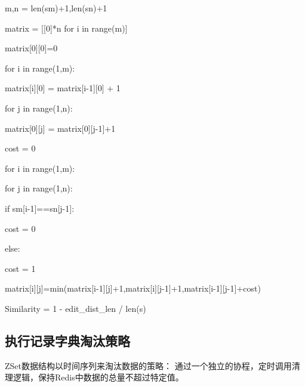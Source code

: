 \begin{algorithm}[H]
    \SetAlgoLined

    m,n = len(sm)+1,len(sn)+1

    matrix = [[0]*n for i in range(m)]

    matrix[0][0]=0

    for i in range(1,m):

    matrix[i][0] = matrix[i-1][0] + 1

    for j in range(1,n):

    matrix[0][j] = matrix[0][j-1]+1

    cost = 0

    for i in range(1,m):

    for j in range(1,n):

    if sm[i-1]==sn[j-1]:

    cost = 0

    else:

    cost = 1

    matrix[i][j]=min(matrix[i-1][j]+1,matrix[i][j-1]+1,matrix[i-1][j-1]+cost)

    Similarity = 1 - edit\_dist\_len / len(s)

\end{algorithm}

%

\subsection{执行记录字典淘汰策略}
ZSet数据结构以时间序列来淘汰数据的策略： 通过一个独立的协程，定时调用清理逻辑，保持Redis中数据的总量不超过特定值。


